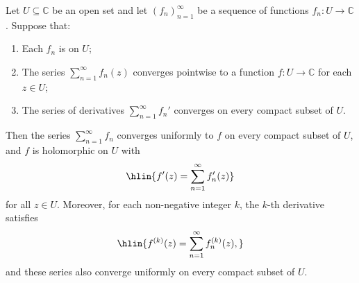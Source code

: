 \begin{theorem} \label{theorem:termwise_differentiation_of_uniformly_convergent_complex_series}
Let $U \subseteq \mathbb{C}$ be an open set and let $(f_n)_{n=1}^\infty$ be a sequence of functions $f_n : U \to \mathbb{C}$. Suppose that:

\begin{enumerate}
    \item Each $f_n$ is  on $U$;
    \item The series $\sum_{n=1}^\infty f_n(z)$ converges pointwise to a function $f : U \to \mathbb{C}$ for each $z \in U$;
    \item The series of derivatives $\sum_{n=1}^\infty f_n'$ converges  on every compact subset of $U$.
\end{enumerate}

Then the series $\sum_{n=1}^\infty f_n$ converges uniformly to $f$ on every compact subset of $U$, and $f$ is holomorphic on $U$ with
$$\hlin{f'(z) = \sum_{n=1}^\infty f_n'(z)}$$
for all $z \in U$. Moreover, for each non-negative integer $k$, the $k$-th derivative satisfies
$$\hlin{f^{(k)}(z) = \sum_{n=1}^\infty f_n^{(k)}(z),}$$
and these series also converge uniformly on every compact subset of $U$.
\end{theorem}

